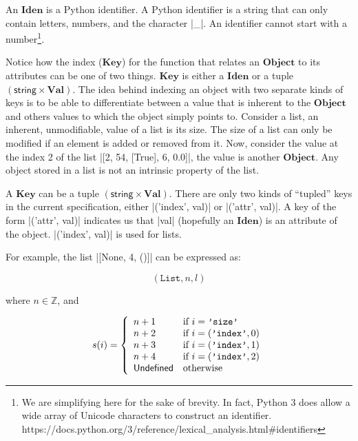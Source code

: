 An \(\mathbf{Iden}\) is a Python identifier. A Python identifier is a string that can only
contain letters, numbers, and the character \pycode|_|.  An identifier cannot start with a
number\footnote{We are simplifying here for the sake of brevity. In fact, Python 3 does
  allow a wide array of Unicode characters to construct an identifier.
  https://docs.python.org/3/reference/lexical\_analysis.html\#identifiers}.

Notice how the index (\(\mathbf{Key}\)) for the function that relates an
\(\mathbf{Object}\) to its attributes can be one of two things. \(\mathbf{Key}\) is either
a \(\mathbf{Iden}\) or a tuple \(\left(\textsf{string} \times \mathbf{Val}\right)\). The
idea behind indexing an object with two separate kinds of keys is to be able to
differentiate between a value that is inherent to the \(\mathbf{Object}\) and others
values to which the object simply points to. Consider a list, an inherent, unmodifiable,
value of a list is its size. The size of a list can only be modified if an element is
added or removed from it.  Now, consider the value at the index 2 of the list
\pycode|[2, 54, [True], 6, 0.0]|, the value is another \(\mathbf{Object}\). Any object
stored in a list is not an intrinsic property of the list.

A \(\mathbf{Key}\) can be a tuple \(\left(\textsf{string} \times \mathbf{Val}\right)\).
There are only two kinds of \enquote{tupled} keys in the current specification, either
\pycode|('index', val)| or \pycode|('attr', val)|. A key of the form
\pycode|('attr', val)| indicates us that \pycode|val| (hopefully an \(\mathbf{Iden}\)) is
an attribute of the object. \pycode|('index', val)| is used for lists.

For example, the list \pycode|[None, 4, ()]| can be expressed as:

  \[\left(\texttt{List}, n, l\right)\]

  where \(n \in \mathbb{Z}\), and

  \[s(i) = \left\{
    \begin{array}{ll}
      n + 1 & \text{if } i = \texttt{'size'} \\
      n + 2 & \text{if } i = (\texttt{'index'}, 0) \\
      n + 3 & \text{if } i = (\texttt{'index'}, 1) \\
      n + 4 & \text{if } i = (\texttt{'index'}, 2) \\
      \mathsf{Undefined}        & \text{otherwise} \\
    \end{array}
  \right.\]



